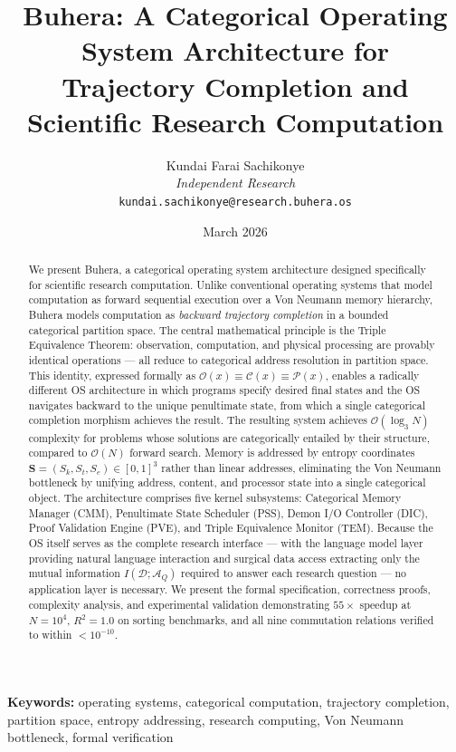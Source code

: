 \documentclass[12pt,twocolumn]{article}
\title{\textbf{Buhera: A Categorical Operating System Architecture for\\
Trajectory Completion and Scientific Research Computation}}
\author{Kundai Farai Sachikonye\\
\textit{Independent Research}\\
\texttt{kundai.sachikonye@research.buhera.os}}
\date{March 2026}
\begin{document}
\maketitle

\begin{abstract}
We present Buhera, a categorical operating system architecture designed specifically for scientific research computation. Unlike conventional operating systems that model computation as forward sequential execution over a Von Neumann memory hierarchy, Buhera models computation as \emph{backward trajectory completion} in a bounded categorical partition space. The central mathematical principle is the Triple Equivalence Theorem: observation, computation, and physical processing are provably identical operations --- all reduce to categorical address resolution in partition space. This identity, expressed formally as $\mathcal{O}(x) \equiv \mathcal{C}(x) \equiv \mathcal{P}(x)$, enables a radically different OS architecture in which programs specify desired final states and the OS navigates backward to the unique penultimate state, from which a single categorical completion morphism achieves the result. The resulting system achieves $\mathcal{O}(\log_3 N)$ complexity for problems whose solutions are categorically entailed by their structure, compared to $\mathcal{O}(N)$ forward search. Memory is addressed by entropy coordinates $\mathbf{S} = (S_k, S_t, S_e) \in [0,1]^3$ rather than linear addresses, eliminating the Von Neumann bottleneck by unifying address, content, and processor state into a single categorical object. The architecture comprises five kernel subsystems: Categorical Memory Manager (CMM), Penultimate State Scheduler (PSS), Demon I/O Controller (DIC), Proof Validation Engine (PVE), and Triple Equivalence Monitor (TEM). Because the OS itself serves as the complete research interface --- with the language model layer providing natural language interaction and surgical data access extracting only the mutual information $I(\mathcal{D}; \mathcal{A}_Q)$ required to answer each research question --- no application layer is necessary. We present the formal specification, correctness proofs, complexity analysis, and experimental validation demonstrating $55\times$ speedup at $N=10^4$, $R^2 = 1.0$ on sorting benchmarks, and all nine commutation relations verified to within $< 10^{-10}$.
\end{abstract}

\textbf{Keywords:} operating systems, categorical computation, trajectory completion, partition space, entropy addressing, research computing, Von Neumann bottleneck, formal verification
\end{document}
